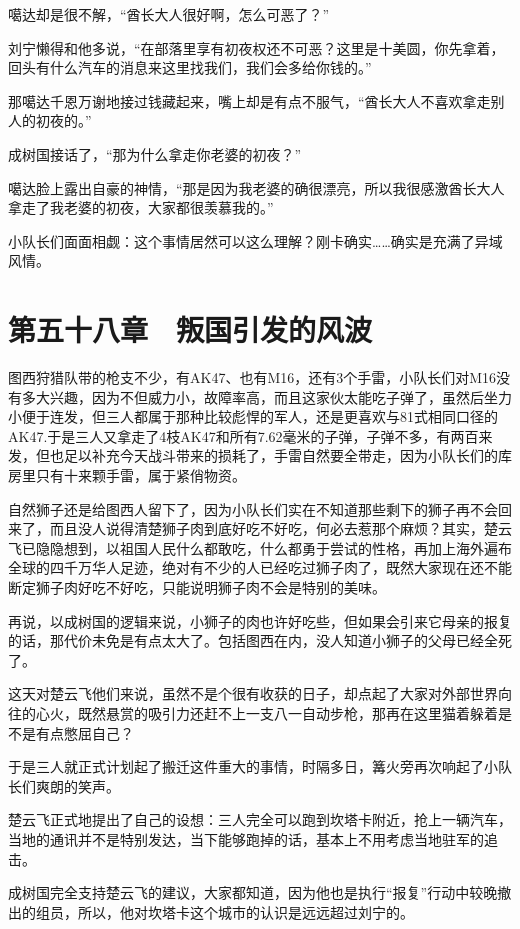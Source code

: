 噶达却是很不解，“酋长大人很好啊，怎么可恶了？”

刘宁懒得和他多说，“在部落里享有初夜权还不可恶？这里是十美圆，你先拿着，回头有什么汽车的消息来这里找我们，我们会多给你钱的。”

那噶达千恩万谢地接过钱藏起来，嘴上却是有点不服气，“酋长大人不喜欢拿走别人的初夜的。”

成树国接话了，“那为什么拿走你老婆的初夜？”

噶达脸上露出自豪的神情，“那是因为我老婆的确很漂亮，所以我很感激酋长大人拿走了我老婆的初夜，大家都很羡慕我的。”

小队长们面面相觑：这个事情居然可以这么理解？刚卡确实……确实是充满了异域风情。

\section{第五十八章　叛国引发的风波}

图西狩猎队带的枪支不少，有AK47、也有M16，还有3个手雷，小队长们对M16没有多大兴趣，因为不但威力小，故障率高，而且这家伙太能吃子弹了，虽然后坐力小便于连发，但三人都属于那种比较彪悍的军人，还是更喜欢与81式相同口径的AK47.于是三人又拿走了4枝AK47和所有7.62毫米的子弹，子弹不多，有两百来发，但也足以补充今天战斗带来的损耗了，手雷自然要全带走，因为小队长们的库房里只有十来颗手雷，属于紧俏物资。

自然狮子还是给图西人留下了，因为小队长们实在不知道那些剩下的狮子再不会回来了，而且没人说得清楚狮子肉到底好吃不好吃，何必去惹那个麻烦？其实，楚云飞已隐隐想到，以祖国人民什么都敢吃，什么都勇于尝试的性格，再加上海外遍布全球的四千万华人足迹，绝对有不少的人已经吃过狮子肉了，既然大家现在还不能断定狮子肉好吃不好吃，只能说明狮子肉不会是特别的美味。

再说，以成树国的逻辑来说，小狮子的肉也许好吃些，但如果会引来它母亲的报复的话，那代价未免是有点太大了。包括图西在内，没人知道小狮子的父母已经全死了。

这天对楚云飞他们来说，虽然不是个很有收获的日子，却点起了大家对外部世界向往的心火，既然悬赏的吸引力还赶不上一支八一自动步枪，那再在这里猫着躲着是不是有点憋屈自己？

于是三人就正式计划起了搬迁这件重大的事情，时隔多日，篝火旁再次响起了小队长们爽朗的笑声。

楚云飞正式地提出了自己的设想：三人完全可以跑到坎塔卡附近，抢上一辆汽车，当地的通讯并不是特别发达，当下能够跑掉的话，基本上不用考虑当地驻军的追击。

成树国完全支持楚云飞的建议，大家都知道，因为他也是执行“报复”行动中较晚撤出的组员，所以，他对坎塔卡这个城市的认识是远远超过刘宁的。

